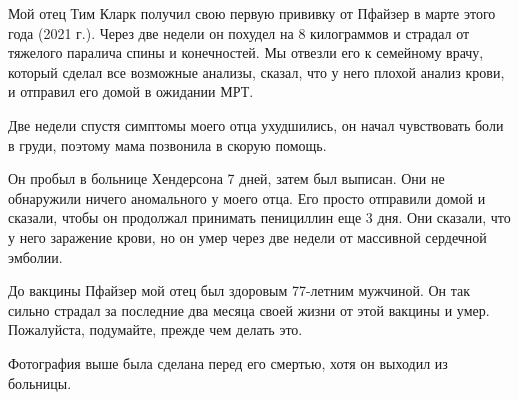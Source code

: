 Мой отец Тим Кларк получил свою первую прививку от Пфайзер в марте этого года
(2021 г.). Через две недели он похудел на 8 килограммов и страдал от тяжелого
паралича спины и конечностей. Мы отвезли его к семейному врачу, который сделал
все возможные анализы, сказал, что у него плохой анализ крови, и отправил его
домой в ожидании МРТ.

Две недели спустя симптомы моего отца ухудшились, он начал чувствовать боли в
груди, поэтому мама позвонила в скорую помощь.

Он пробыл в больнице Хендерсона 7 дней, затем был выписан. Они не обнаружили
ничего аномального у моего отца. Его просто отправили домой и сказали, чтобы он
продолжал принимать пенициллин еще 3 дня. Они сказали, что у него заражение
крови, но он умер через две недели от массивной сердечной эмболии.

До вакцины Пфайзер мой отец был здоровым 77-летним мужчиной. Он так сильно
страдал за последние два месяца своей жизни от этой вакцины и умер. Пожалуйста,
подумайте, прежде чем делать это.

Фотография выше была сделана перед его смертью, хотя он выходил из больницы.

